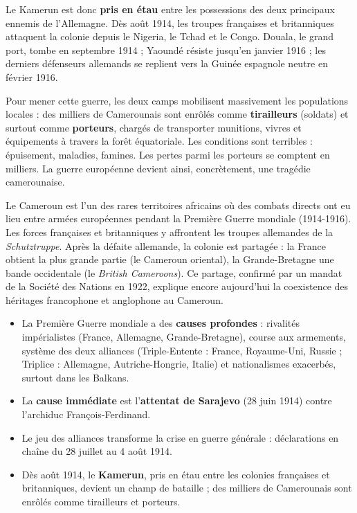 \documentclass[11pt]{article}
\newcommand{\cle}[1]{{\popxbold\color{popdark}#1}}
\begin{document}
Le Kamerun est donc \textbf{pris en étau} entre les possessions des deux principaux ennemis de l'Allemagne. Dès août 1914, les troupes françaises et britanniques attaquent la colonie depuis le Nigeria, le Tchad et le Congo. Douala, le grand port, tombe en septembre 1914 ; Yaoundé résiste jusqu'en janvier 1916 ; les derniers défenseurs allemands se replient vers la Guinée espagnole neutre en février 1916.

Pour mener cette guerre, les deux camps mobilisent massivement les populations locales : des milliers de Camerounais sont enrôlés comme \textbf{tirailleurs} (soldats) et surtout comme \textbf{porteurs}, chargés de transporter munitions, vivres et équipements à travers la forêt équatoriale. Les conditions sont terribles : épuisement, maladies, famines. Les pertes parmi les porteurs se comptent en milliers. La guerre européenne devient ainsi, concrètement, une tragédie camerounaise.

\begin{savaistu}
Le Cameroun est l'un des rares territoires africains où des combats directs ont eu lieu entre armées européennes pendant la Première Guerre mondiale (1914-1916). Les forces françaises et britanniques y affrontent les troupes allemandes de la \emph{Schutztruppe}. Après la défaite allemande, la colonie est partagée : la France obtient la plus grande partie (le Cameroun oriental), la Grande-Bretagne une bande occidentale (le \emph{British Cameroons}). Ce partage, confirmé par un mandat de la Société des Nations en 1922, explique encore aujourd'hui la coexistence des héritages francophone et anglophone au Cameroun.
\end{savaistu}

\begin{aretenir}
\begin{itemize}
\item La Première Guerre mondiale a des \textbf{causes profondes} : rivalités impérialistes (France, Allemagne, Grande-Bretagne), course aux armements, système des deux alliances (\cle{Triple-Entente} : France, Royaume-Uni, Russie ; \cle{Triplice} : Allemagne, Autriche-Hongrie, Italie) et nationalismes exacerbés, surtout dans les Balkans.
\item La \textbf{cause immédiate} est l'\textbf{attentat de Sarajevo} (28 juin 1914) contre l'archiduc François-Ferdinand.
\item Le jeu des alliances transforme la crise en guerre générale : déclarations en chaîne du 28 juillet au 4 août 1914.
\item Dès août 1914, le \textbf{Kamerun}, pris en étau entre les colonies françaises et britanniques, devient un champ de bataille ; des milliers de Camerounais sont enrôlés comme tirailleurs et porteurs.
\end{itemize}
\end{aretenir}
\end{document}
